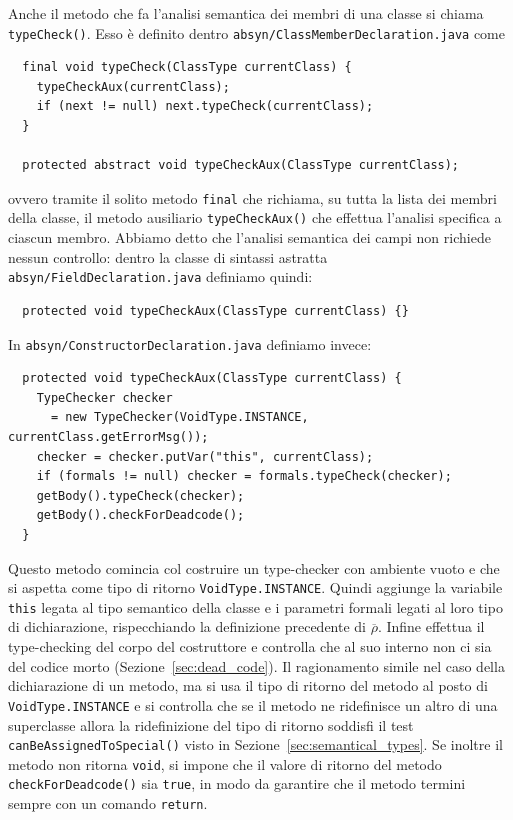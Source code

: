 Anche il metodo che fa l'analisi semantica dei membri di una classe si
chiama \texttt{typeCheck()}. Esso \`e definito dentro
\texttt{absyn/ClassMemberDeclaration.java} come
%
\begin{verbatim}
  final void typeCheck(ClassType currentClass) {
    typeCheckAux(currentClass);
    if (next != null) next.typeCheck(currentClass);
  }

  protected abstract void typeCheckAux(ClassType currentClass);
\end{verbatim}
ovvero tramite il solito metodo \texttt{final} che richiama, su tutta la
lista dei membri della classe, il metodo ausiliario
\texttt{typeCheckAux()} che effettua l'analisi specifica a ciascun membro.
Abbiamo detto che l'analisi semantica dei campi non richiede nessun controllo:
dentro la classe di sintassi astratta
\texttt{absyn/FieldDeclaration.java} definiamo quindi:
%
\begin{verbatim}
  protected void typeCheckAux(ClassType currentClass) {}
\end{verbatim}
In \texttt{absyn/ConstructorDeclaration.java} definiamo invece:
%
\begin{verbatim}
  protected void typeCheckAux(ClassType currentClass) {
    TypeChecker checker
      = new TypeChecker(VoidType.INSTANCE, currentClass.getErrorMsg());
    checker = checker.putVar("this", currentClass);
    if (formals != null) checker = formals.typeCheck(checker);
    getBody().typeCheck(checker);
    getBody().checkForDeadcode();
  }
\end{verbatim}
Questo metodo comincia col costruire un type-checker con ambiente vuoto e
che si aspetta come tipo di ritorno \texttt{VoidType.INSTANCE}. Quindi aggiunge
la variabile \texttt{this} legata al tipo semantico
della classe e i parametri formali legati al loro tipo di dichiarazione,
rispecchiando la definizione precedente di $\overline{\rho}$.
Infine effettua il type-checking del corpo del costruttore e controlla che al
suo interno non ci sia del codice morto (Sezione~\ref{sec:dead_code}).
Il ragionamento \e simile nel caso della dichiarazione di un metodo,
ma si usa il tipo di ritorno del metodo al posto di \texttt{VoidType.INSTANCE} e si
controlla che se il metodo ne ridefinisce un
altro di una superclasse allora la ridefinizione del tipo di ritorno
soddisfi il test \texttt{canBeAssignedToSpecial()}
visto in Sezione~\ref{sec:semantical_types}. Se inoltre il metodo non
ritorna \texttt{void}, si impone che il valore di ritorno del metodo
\texttt{checkForDeadcode()} sia \texttt{true}, in modo da garantire che
il metodo termini sempre con un comando \texttt{return}.

